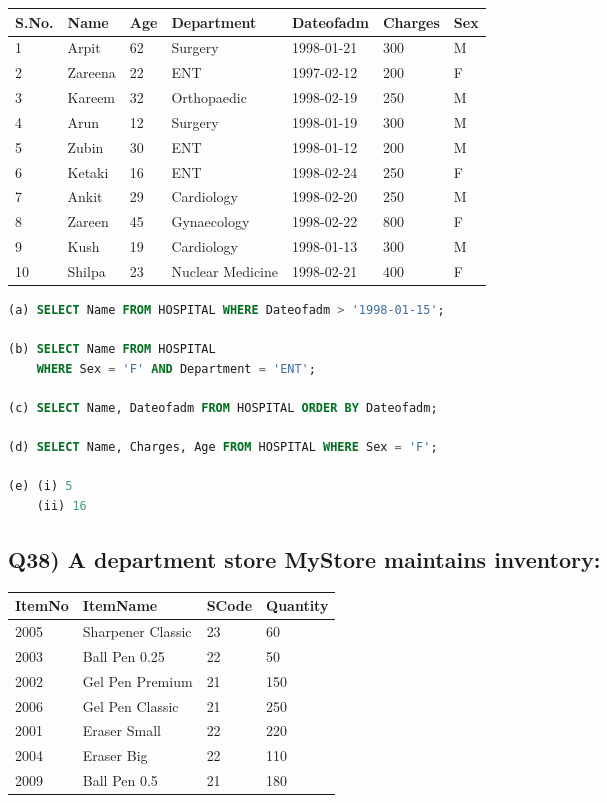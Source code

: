 \documentclass{article}
\begin{document}
\begin{tabular}{|l|l|l|l|l|l|l|}
\hline
S.No. & Name & Age & Department & Dateofadm & Charges & Sex \\
\hline
1 & Arpit & 62 & Surgery & 1998-01-21 & 300 & M \\
2 & Zareena & 22 & ENT & 1997-02-12 & 200 & F \\
3 & Kareem & 32 & Orthopaedic & 1998-02-19 & 250 & M \\
4 & Arun & 12 & Surgery & 1998-01-19 & 300 & M \\
5 & Zubin & 30 & ENT & 1998-01-12 & 200 & M \\
6 & Ketaki & 16 & ENT & 1998-02-24 & 250 & F \\
7 & Ankit & 29 & Cardiology & 1998-02-20 & 250 & M \\
8 & Zareen & 45 & Gynaecology & 1998-02-22 & 800 & F \\
9 & Kush & 19 & Cardiology & 1998-01-13 & 300 & M \\
10 & Shilpa & 23 & Nuclear Medicine & 1998-02-21 & 400 & F \\
\hline
\end{tabular}

\begin{lstlisting}[language=SQL]
(a) SELECT Name FROM HOSPITAL WHERE Dateofadm > '1998-01-15';

(b) SELECT Name FROM HOSPITAL 
    WHERE Sex = 'F' AND Department = 'ENT';

(c) SELECT Name, Dateofadm FROM HOSPITAL ORDER BY Dateofadm;

(d) SELECT Name, Charges, Age FROM HOSPITAL WHERE Sex = 'F';

(e) (i) 5
    (ii) 16
\end{lstlisting}

\subsection*{Q38) A department store MyStore maintains inventory:}

\begin{tabular}{|l|l|l|l|}
\hline
ItemNo & ItemName & SCode & Quantity \\
\hline
2005 & Sharpener Classic & 23 & 60 \\
2003 & Ball Pen 0.25 & 22 & 50 \\
2002 & Gel Pen Premium & 21 & 150 \\
2006 & Gel Pen Classic & 21 & 250 \\
2001 & Eraser Small & 22 & 220 \\
2004 & Eraser Big & 22 & 110 \\
2009 & Ball Pen 0.5 & 21 & 180 \\
\hline
\end{tabular}
\end{document}
